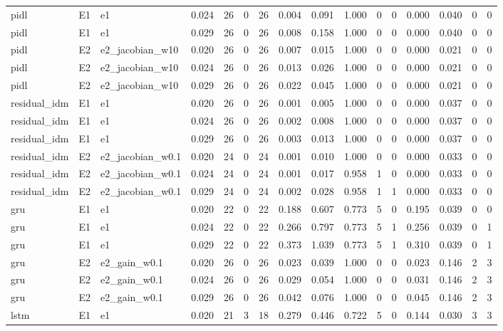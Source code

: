 \begin{table}[htbp]
{\begin{tabular}{lllrrrrrrrrrrrrr}
pidl & E1 & e1 & 0.024 & 26 & 0 & 26 & 0.004 & 0.091 & 1.000 & 0 & 0 & 0.000 & 0.040 & 0 & 0 \\
pidl & E1 & e1 & 0.029 & 26 & 0 & 26 & 0.008 & 0.158 & 1.000 & 0 & 0 & 0.000 & 0.040 & 0 & 0 \\
pidl & E2 & e2\_jacobian\_w10 & 0.020 & 26 & 0 & 26 & 0.007 & 0.015 & 1.000 & 0 & 0 & 0.000 & 0.021 & 0 & 0 \\
pidl & E2 & e2\_jacobian\_w10 & 0.024 & 26 & 0 & 26 & 0.013 & 0.026 & 1.000 & 0 & 0 & 0.000 & 0.021 & 0 & 0 \\
pidl & E2 & e2\_jacobian\_w10 & 0.029 & 26 & 0 & 26 & 0.022 & 0.045 & 1.000 & 0 & 0 & 0.000 & 0.021 & 0 & 0 \\
residual\_idm & E1 & e1 & 0.020 & 26 & 0 & 26 & 0.001 & 0.005 & 1.000 & 0 & 0 & 0.000 & 0.037 & 0 & 0 \\
residual\_idm & E1 & e1 & 0.024 & 26 & 0 & 26 & 0.002 & 0.008 & 1.000 & 0 & 0 & 0.000 & 0.037 & 0 & 0 \\
residual\_idm & E1 & e1 & 0.029 & 26 & 0 & 26 & 0.003 & 0.013 & 1.000 & 0 & 0 & 0.000 & 0.037 & 0 & 0 \\
residual\_idm & E2 & e2\_jacobian\_w0.1 & 0.020 & 24 & 0 & 24 & 0.001 & 0.010 & 1.000 & 0 & 0 & 0.000 & 0.033 & 0 & 0 \\
residual\_idm & E2 & e2\_jacobian\_w0.1 & 0.024 & 24 & 0 & 24 & 0.001 & 0.017 & 0.958 & 1 & 0 & 0.000 & 0.033 & 0 & 0 \\
residual\_idm & E2 & e2\_jacobian\_w0.1 & 0.029 & 24 & 0 & 24 & 0.002 & 0.028 & 0.958 & 1 & 1 & 0.000 & 0.033 & 0 & 0 \\
gru & E1 & e1 & 0.020 & 22 & 0 & 22 & 0.188 & 0.607 & 0.773 & 5 & 0 & 0.195 & 0.039 & 0 & 0 \\
gru & E1 & e1 & 0.024 & 22 & 0 & 22 & 0.266 & 0.797 & 0.773 & 5 & 1 & 0.256 & 0.039 & 0 & 1 \\
gru & E1 & e1 & 0.029 & 22 & 0 & 22 & 0.373 & 1.039 & 0.773 & 5 & 1 & 0.310 & 0.039 & 0 & 1 \\
gru & E2 & e2\_gain\_w0.1 & 0.020 & 26 & 0 & 26 & 0.023 & 0.039 & 1.000 & 0 & 0 & 0.023 & 0.146 & 2 & 3 \\
gru & E2 & e2\_gain\_w0.1 & 0.024 & 26 & 0 & 26 & 0.029 & 0.054 & 1.000 & 0 & 0 & 0.031 & 0.146 & 2 & 3 \\
gru & E2 & e2\_gain\_w0.1 & 0.029 & 26 & 0 & 26 & 0.042 & 0.076 & 1.000 & 0 & 0 & 0.045 & 0.146 & 2 & 3 \\
lstm & E1 & e1 & 0.020 & 21 & 3 & 18 & 0.279 & 0.446 & 0.722 & 5 & 0 & 0.144 & 0.030 & 3 & 3 \\

\end{tabular}}
\end{table}
